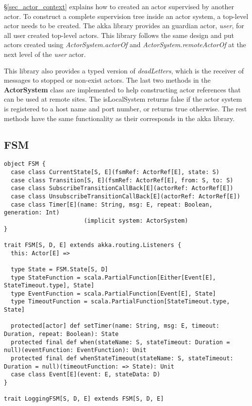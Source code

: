 \S\ref{sec_actor_context} explains how to created an actor supervised by another actor.  To construct a complete supervision tree inside an actor system, a top-level actor needs to be created.  The akka library \cite{akka_doc} provides an guardian actor, \textit{user}, for all user created top-level actors.  This library follows the same design and put actors created using \textit{ActorSystem.actorOf} and \textit{ActorSystem.remoteActorOf} at the next level of the \textit{user} actor.

This library also provides a typed version of \textit{deadLetters}, which is the receiver of messages to stopped or non-exist actors.  The last two methods in the \textbf{ActorSystem} class are implemented to help constructing actor references that can be used at remote sites.  The isLocalSystem returns false if the actor system is registered to a host name and port number, or returns true otherwise.  The rest methods have the same functionality as their corresponds in the akka library\cite{akka_api}.

\subsection{FSM}

\begin{lstlisting}
object FSM {
  case class CurrentState[S, E](fsmRef: ActorRef[E], state: S)
  case class Transition[S, E](fsmRef: ActorRef[E], from: S, to: S)
  case class SubscribeTransitionCallBack[E](actorRef: ActorRef[E])
  case class UnsubscribeTransitionCallBack[E](actorRef: ActorRef[E])
  case class Timer[E](name: String, msg: E, repeat: Boolean, generation: Int)
                       (implicit system: ActorSystem) 
}

trait FSM[S, D, E] extends akka.routing.Listeners {
  this: Actor[E] =>

  type State = FSM.State[S, D]
  type StateFunction = scala.PartialFunction[Either[Event[E], StateTimeout.type], State]
  type EventFunction = scala.PartialFunction[Event[E], State]
  type TimeoutFunction = scala.PartialFunction[StateTimeout.type, State]
  
  protected[actor] def setTimer(name: String, msg: E, timeout: Duration, repeat: Boolean): State
  protected final def when(stateName: S, stateTimeout: Duration = null)(eventFunction: EventFunction): Unit
  protected final def whenStateTimeout(stateName: S, stateTimeout: Duration = null)(timeoutFunction: => State): Unit
  case class Event[E](event: E, stateData: D)
}

trait LoggingFSM[S, D, E] extends FSM[S, D, E]
\end{lstlisting}

